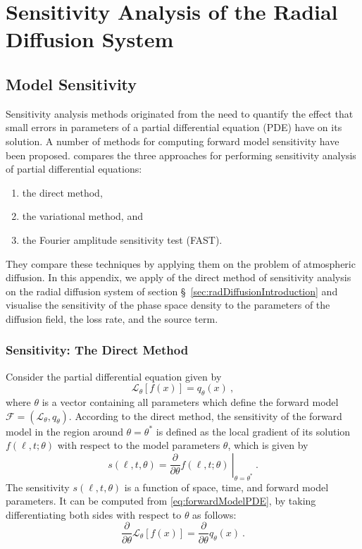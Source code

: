 \chapter{Sensitivity Analysis of the Radial Diffusion System}\label{app:psdSensitivity}

\section*{Model Sensitivity}

Sensitivity analysis methods originated from the need to quantify the effect that small errors in 
parameters of a partial differential equation (PDE) have on its solution. A number of methods for 
computing forward model sensitivity have been proposed. \citet{KODA1979259} compares the three 
approaches for performing sensitivity analysis of partial differential equations:
\begin{enumerate}
    \item the direct method,
    \item the variational method, and 
    \item the Fourier amplitude sensitivity test (FAST).
\end{enumerate}
They compare these techniques by applying them on the problem of atmospheric diffusion. In this 
appendix, we apply of the direct method of sensitivity analysis on the radial diffusion system 
of section \S~\ref{sec:radDiffusionIntroduction} and visualise the sensitivity of the phase 
space density to the parameters of the diffusion field, the loss rate, and the source term.


\subsection*{Sensitivity: The Direct Method}

Consider the partial differential equation given by 
\begin{equation}\label{eq:forwardModelPDE}
    \mathcal{L}_{\theta}[f(x)] = q_{\theta}(x) \ ,
\end{equation}
where $\theta$ is a vector containing all parameters which define the forward model 
$\mathcal{F} = (\mathcal{L}_{\theta}, q_{\theta})$. According to the direct method, the sensitivity 
of the forward model in the region around $\theta = \theta^{\ast}$ is defined as the local 
gradient of its solution $f(\ell, t; \theta)$ with respect to the model parameters $\theta$, which 
is given by 
\[
    s(\ell, t, \theta) =  
    \left. \frac{\partial}{\partial \theta}f(\ell, t; \theta) \ 
    \right\rvert_{\theta = \theta^{\ast}} \ .
\] 
%
The sensitivity $s(\ell, t, \theta)$ is a function of space, time, and forward model parameters. It 
can be computed from \cref{eq:forwardModelPDE}, by taking differentiating both sides with respect 
to $\theta$ as follows:  
\[
    \frac{\partial}{\partial{\theta}} \mathcal{L}_{\theta}[f(x)] = 
        \frac{\partial}{\partial{\theta}} q_{\theta}(x) \ .
\] 




